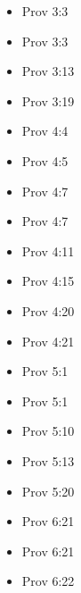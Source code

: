 \documentclass[14pt]{article}
\begin{document}
\begin{multicols}{2}
\begin{itemize}
									\item Prov 3:3
									
									\item Prov 3:3
									
									\item Prov 3:13
									
									\item Prov 3:19
									
									\item Prov 4:4
									
									\item Prov 4:5
									
									\item Prov 4:7
									
									\item Prov 4:7
									
									\item Prov 4:11
									
									\item Prov 4:15
									
									\item Prov 4:20
									
									\item Prov 4:21
									
									\item Prov 5:1
									
									\item Prov 5:1
									
									\item Prov 5:10
									
									\item Prov 5:13
									
									\item Prov 5:20
									
									\item Prov 6:21
									
									\item Prov 6:21
									
									\item Prov 6:22
									

\end{itemize}
\end{multicols}
\end{document}
